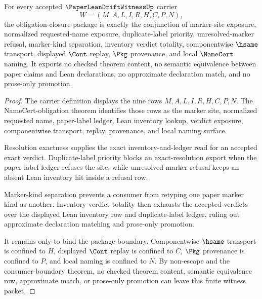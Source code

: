 \begin{theorem}
\label{thm:paper-lean-drift-witness-obligation-closure-package}
For every accepted $\PaperLeanDriftWitnessUp$ carrier
$$
W=(M,A,L,I,R,H,C,P,N),
$$
the obligation-closure package is exactly the conjunction of marker-site exposure, normalized requested-name exposure, duplicate-label priority, unresolved-marker refusal, marker-kind separation, inventory verdict totality, componentwise $\hsame$ transport, displayed $\Cont$ replay, $\Pkg$ provenance, and local $\NameCert$ naming. It exports no checked theorem content, no semantic equivalence between paper claims and Lean declarations, no approximate declaration match, and no prose-only promotion.
\end{theorem}
\begin{proof}
The carrier definition displays the nine rows $M,A,L,I,R,H,C,P,N$. The NameCert-obligation theorem identifies those rows as the marker site, normalized requested name, paper-label ledger, Lean inventory lookup, verdict exposure, componentwise transport, replay, provenance, and local naming surface.

Resolution exactness supplies the exact inventory-and-ledger read for an accepted exact verdict. Duplicate-label priority blocks an exact-resolution export when the paper-label ledger refuses the site, while unresolved-marker refusal keeps an absent Lean inventory hit inside a refusal row.

Marker-kind separation prevents a consumer from retyping one paper marker kind as another. Inventory verdict totality then exhausts the accepted verdicts over the displayed Lean inventory row and duplicate-label ledger, ruling out approximate declaration matching and prose-only promotion.

It remains only to bind the package boundary. Componentwise $\hsame$ transport is confined to $H$, displayed $\Cont$ replay is confined to $C$, $\Pkg$ provenance is confined to $P$, and local naming is confined to $N$. By non-escape and the consumer-boundary theorem, no checked theorem content, semantic equivalence row, approximate match, or prose-only promotion can leave this finite witness packet.
\end{proof}

